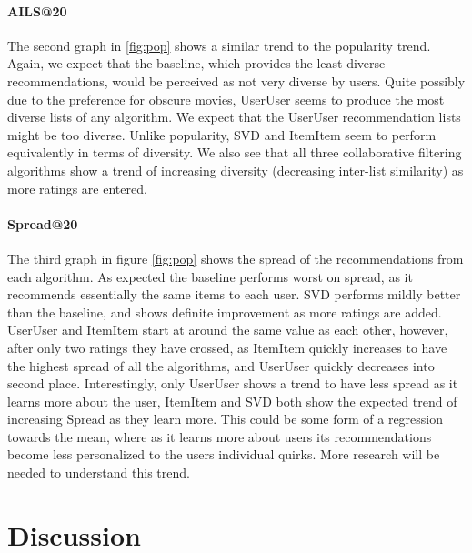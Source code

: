 \documentclass[letterpaper]{sig-alternate}
\begin{document}
  \paragraph{AILS@20}
  The second graph in \ref{fig:pop} shows a similar trend to the popularity trend.
  Again, we expect that the baseline, which provides the least diverse recommendations, would be perceived as not very diverse by users.
  Quite possibly due to the preference for obscure movies, UserUser seems to produce the most diverse lists of any algorithm.
  We expect that the UserUser recommendation lists might be too diverse.
  Unlike popularity, SVD and ItemItem seem to perform equivalently in terms of diversity.
  We also see that all three collaborative filtering algorithms show a trend of increasing diversity (decreasing  inter-list similarity) as more ratings are entered.

  \paragraph{Spread@20}
  The third graph in figure \ref{fig:pop} shows the spread of the recommendations from each algorithm.
  As expected the baseline performs worst on spread, as it recommends essentially the same items to each user.
  SVD performs mildly better than the baseline, and shows definite improvement as more ratings are added.
  UserUser and ItemItem start at around the same value as each other, however, after only two ratings they have crossed, as ItemItem quickly increases to have the highest spread of all the algorithms, and UserUser quickly decreases into second place.
  Interestingly, only UserUser shows a trend to have less spread as it learns more about the user, ItemItem and SVD both show the expected trend of increasing Spread as they learn more.
  This could be some form of a regression towards the mean, where as it learns more about users its recommendations become less personalized to the users individual quirks.
  More research will be needed to understand this trend.
  

\section{Discussion}
\end{document}
